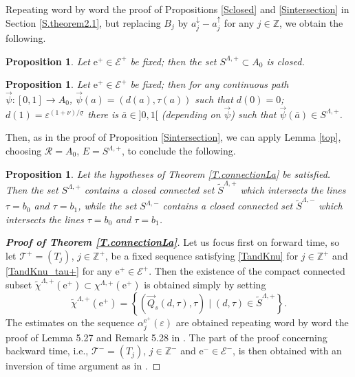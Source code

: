 \documentclass[10pt]{article}
\numberwithin{equation}{section}
\def\ep{\varepsilon}
\def\Z{{\mathbb Z}}
\def\ee{{\mathrm e}}
\def\EE{{\mathcal E}}
\def\TT{{\mathcal T}}
\def\aup{a^{\uparrow}}
\def\adown{a^{\downarrow}}
\def\Q{\vec{Q}}
\newtheorem{proposition}[theorem]{Proposition}
\theoremstyle{definition}
\theoremstyle{remark}
\begin{document}
Repeating word by word the proof of Propositions \ref{Sclosed} and \ref{Sintersection} in Section \ref{S.theorem2.1},
but replacing $B_j$ by $\adown_j-\aup_j$  for any $j \in \Z$,
we obtain the following.
\begin{proposition}\label{Sclosedbis}
Let $\ee^+ \in \EE^+$ be fixed; then the set $S^{\Lambda,+} \subset A_0$ is closed.
\end{proposition}
\begin{proposition}\label{Sintersectionbis}
Let $\ee^+ \in \EE^+$ be fixed; then for any continuous path $\vec{\psi} : [0,1] \to A_0$, $\vec{\psi}(a)=(d(a),\tau(a))$ such that
$d(0)=0$;
$d(1)=
\ep^{(1+\nu)/\underline{\sigma}}$ there is
$\bar{a} \in ]0,1[$ (depending on $\vec{\psi}$) such that  $\vec{\psi}(\bar{a}) \in S^{\Lambda,+}$.
\end{proposition}
Then, as in  the proof of Proposition \ref{Sintersection},     we can apply Lemma \ref{top}, choosing  $\mathcal{R}= A_0$, $E= S^{\Lambda,+}$,
to
conclude
the following.
\begin{proposition}\label{topologicalbis}
Let the hypotheses of Theorem \ref{T.connectionLa} be satisfied.
Then the set $S^{\Lambda,+}$  contains a closed connected set $\tilde{S}^{\Lambda,+}$
which intersects the lines $\tau=b_0$ and $\tau=b_1$,
while the set $S^{\Lambda,-}$  contains a closed connected set $\tilde{S}^{\Lambda,-}$
which intersects the lines $\tau=b_0$ and $\tau=b_1$.
\end{proposition}
\begin{proof}[\textbf{Proof of Theorem \ref{T.connectionLa}}]
Let us focus first on forward time, so let $\TT^+=(T_j)$, $j \in \Z^+$, be a fixed sequence satisfying
\eqref{TandKnu} for $j \in \Z^+$   and \eqref{TandKnu_tau+} for any   $\ee^+ \in \EE^+$. Then the existence of the compact connected subset
$\tilde{\chi}^{\Lambda,+}(\ee^+) \subset \chi^{\Lambda,+}(\ee^+)$ is obtained simply by setting
$$\tilde{\chi}^{\Lambda,+}(\ee^+)=  \left\{ (\Q_s(d,\tau),\tau)   \mid  (d,\tau) \in \tilde{S}^{\Lambda,+}   \right\} .$$
  The estimates on the sequence $\alpha_j^{\ee^+}(\ep)$ are obtained repeating word by word the proof of  Lemma 5.27 and Remark 5.28 in \cite{CFPrestate}.
  The part of the proof concerning backward time, i.e., $\TT^-=(T_j)$, $j \in \Z^-$ and   $\ee^- \in \EE^-$, is then obtained
  with an inversion of time argument as in \cite[\S 5.3]{CFPrestate}.
\end{proof}
\end{document}
